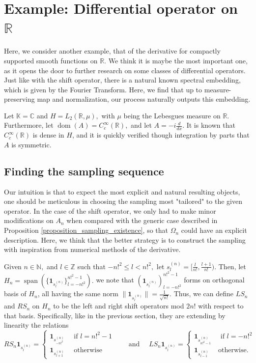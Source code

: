\documentclass{amsart}
\theoremstyle{definition}
\theoremstyle{remark}
\def \Span{\operatorname{span}}
\def \Dom{\operatorname{dom}}
\begin{document}
\section{Example: Differential operator on $\mathbb{R}$}\label{section_differential} Here, we consider another example, that of the derivative for compactly supported smooth functions on $\mathbb{R}$. We think it is maybe the most important one, as it opens the door to further research on some classes of differential operators. Just like with the shift operator, there is a natural known spectral embedding, which is given by the Fourier Transform. Here, we find that up to measure-preserving map and normalization, our process naturally outputs this embedding.

Let $\mathbb{K}=\mathbb{C}$ and $H=L_2(\mathbb{R},\mu),$ with $\mu$ being the Lebesgues measure on $\mathbb{R}.$ Furthermore, let $\Dom(A)=C_c^{\infty}(\mathbb{R}),$ and let $A=-i\frac{d}{dx}.$ It is known that $C_c^{\infty}(\mathbb{R})$ is dense in $H$, and it is quickly verified though integration by parts that $A$ is symmetric.

\subsection{Finding the sampling sequence}\label{subsection_differential_sampling} Our intuition is that to expect the most explicit and natural resulting objects, one should be meticulous in choosing  the sampling most "tailored" to the given operator. In the case of the shift operator, we only had to make minor modifications on $A_n$ when compared with the generic case described in Proposition \ref{proposition_sampling_existence}, so that $\Omega_n$ could have an explicit description. Here, we think that the better strategy is to construct the sampling with inspiration from numerical methods of the derivative.

Given $n\in\mathbb{N},$ and $l\in\mathbb{Z}$ such that $-n!^2\leq l <n!^2,$ let $s_l^{(n)}=[\frac{l}{n!},\frac{l+1}{n!}).$  Then, let $H_n=\Span(\{\mathbf{1}_{s_l^{(n)}}\}_{l=-n!^2}^{n!^2-1}).$ we note that $(\mathbf{1}_{s_{l}^{(n)}})_{l=-n!^2}^{n!^2-1}$ forms on orthogonal basis of $H_n$, all having the same norm $\|\mathbf{1}_{s_{l}^{(n)}}\|=\frac{1}{\sqrt{n!}}.$ Thus, we can define $LS_n$ and $RS_n$ on $H_n$ to be the left and right shift operators mod $2n!$ with respect to that basis. Specifically, like in the previous section, they are extending by linearity the relations $$RS_n \mathbf{1}_{s_{l}^{(n)}} =\begin{cases}
	 \mathbf{1}_{s_{-n!^2}^{(n)}} \quad \text{ if $l=n!^2-1$ }\\
	 \mathbf{1}_{s_{l+1}^{(n)}} \quad \text{ otherwise }
\end{cases} \quad \text{ and }\quad LS_n\mathbf{1}_{s_{l}^{(n)}} =\begin{cases}
	\mathbf{1}_{s_{n!^2-1}^{(n)}} \quad \text{ if $l=-n!^2$ }\\
	\mathbf{1}_{s_{l-1}^{(n)}} \quad \text{ otherwise. }
\end{cases}$$
\end{document}
